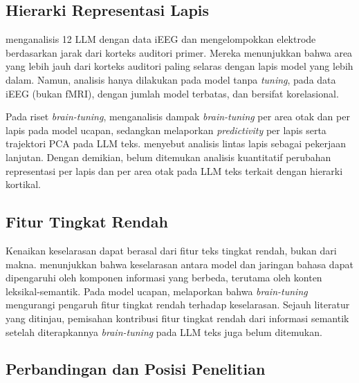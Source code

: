 \subsection{Hierarki Representasi Lapis}
\label{sub:plt_hierarki}

\textcite{mischler2024contextual} menganalisis 12 LLM dengan data iEEG dan mengelompokkan elektrode berdasarkan jarak dari korteks auditori primer. Mereka menunjukkan bahwa area yang lebih jauh dari korteks auditori paling selaras dengan lapis model yang lebih dalam. Namun, analisis hanya dilakukan pada model tanpa \textit{tuning}, pada data iEEG (bukan fMRI), dengan jumlah model terbatas, dan bersifat korelasional.

Pada riset \textit{brain-tuning}, \textcite{moussa2025improving, moussa2026generalizability} menganalisis dampak \textit{brain-tuning} per area otak dan per lapis pada model ucapan, sedangkan \textcite{xiao2026beyond} melaporkan \textit{predictivity} per lapis serta trajektori PCA pada LLM teks. \textcite{negi2025brain} menyebut analisis lintas lapis sebagai pekerjaan lanjutan. %
Dengan demikian, belum ditemukan analisis kuantitatif perubahan representasi per lapis dan per area otak pada LLM teks terkait dengan hierarki kortikal.

\subsection{Fitur Tingkat Rendah}
\label{sub:plt_fitur}

Kenaikan keselarasan dapat berasal dari fitur teks tingkat rendah, bukan dari makna. \textcite{kauf2024lexical} menunjukkan bahwa keselarasan antara model dan jaringan bahasa dapat dipengaruhi oleh komponen informasi yang berbeda, terutama oleh konten leksikal-semantik. Pada model ucapan, \textcite{moussa2025improving} melaporkan bahwa \textit{brain-tuning} mengurangi pengaruh fitur tingkat rendah terhadap keselarasan. %
Sejauh literatur yang ditinjau, pemisahan kontribusi fitur tingkat rendah dari informasi semantik setelah diterapkannya \textit{brain-tuning} pada LLM teks juga belum ditemukan.

\subsection{Perbandingan dan Posisi Penelitian}
\label{sub:plt_posisi}

